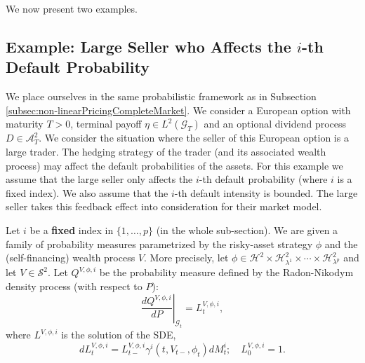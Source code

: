 \documentclass[11pt,a4paper]{article}
\numberwithin{equation}{section}
\theoremstyle{newPlain}
\theoremstyle{newDefinition}
\theoremstyle{newRemark}
\begin{document}
\begin{itemize}
\end{itemize}


We now present two examples.  %

\subsection{\texorpdfstring{Example: Large Seller who Affects the $i$-th Default Probability}{Example: Large Seller who Affects the ith Default Probability}}\label{subsection_large1}

We place ourselves in the same probabilistic framework as in Subsection \ref{subsec:non-linearPricingCompleteMarket}. We consider a European option with maturity $T>0$, terminal payoff $\eta\in L^2(\mathcal{G}_T)$ and an optional dividend process $D\in\mathcal{A}_T^2$. We consider the situation where  the seller of this European option is a large trader.  The hedging strategy of the trader (and its associated wealth process) may affect  the  default probabilities of the assets. For this example we assume that the large seller only affects the $i$-th default probability (where $i$ is a fixed index). We also assume that the $i$-th default intensity is bounded. The large seller takes this feedback effect into consideration for their market model.

 Let $i$ be a \textbf{fixed} index in $\{1,\ldots,p\}$ (in the whole sub-section). We are given a family of probability measures parametrized by  the risky-asset strategy $\phi$ and the (self-financing)  wealth process $V$. More precisely, let  $\phi\in\mathcal{H}^2\times\mathcal{H}_{\lambda^1}^2\times\cdots\times\mathcal{H}_{\lambda^p}^2$ and let $V\in\mathcal{S}^2$.  Let $Q^{V,\phi,i}$ be the probability measure  defined by the Radon-Nikodym density process  (with respect to $P$):
\begin{equation}\label{eq:3_RadonNikodymExample1}
    \left.\frac{dQ^{V,\phi,i}}{dP}\right|_{\mathcal{G}_t} = L_t^{V,\phi,i},
\end{equation}
where $L^{V,\phi,i}$ is the solution of the SDE,
\begin{equation}\label{eq:3_DensitySDE1}
    dL_t^{V,\phi,i} = L_{t-}^{V,\phi,i}\gamma^i(t,V_{t-},\phi_t)dM_t^i;\quad L_0^{V,\phi,i}=1.
\end{equation}
\end{document}
